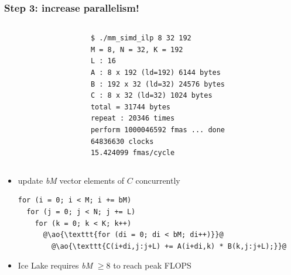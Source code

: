 \documentclass[12pt,dvipdfmx]{beamer}
\newcommand{\ao}[1]{{\color{blue}#1}}
\begin{document}
\begin{frame}[fragile]
\frametitle{Step 3: increase parallelism!}
\begin{columns}
  \begin{column}{0.55\textwidth}
\begin{center}
\def\svgwidth{0.8\textwidth}
%
%
\end{center}
  \end{column}
  \begin{column}{0.4\textwidth}
\begin{lstlisting}
$ ./mm_simd_ilp 8 32 192
M = 8, N = 32, K = 192
L : 16
A : 8 x 192 (ld=192) 6144 bytes
B : 192 x 32 (ld=32) 24576 bytes
C : 8 x 32 (ld=32) 1024 bytes
total = 31744 bytes
repeat : 20346 times
perform 1000046592 fmas ... done
64836630 clocks
15.424099 fmas/cycle
\end{lstlisting}%
  \end{column}
\end{columns}

\begin{itemize}
\item update {\it bM} vector elements of $C$ concurrently
\begin{lstlisting}
for (i = 0; i < M; i += bM)
  for (j = 0; j < N; j += L)  
    for (k = 0; k < K; k++)  
      @\ao{\texttt{for (di = 0; di < bM; di++)}}@
        @\ao{\texttt{C(i+di,j:j+L) += A(i+di,k) * B(k,j:j+L);}}@
\end{lstlisting}

\item Ice Lake requires {\it bM} $\geq 8$ to reach peak FLOPS
\end{itemize}
\end{frame}
\end{document}
